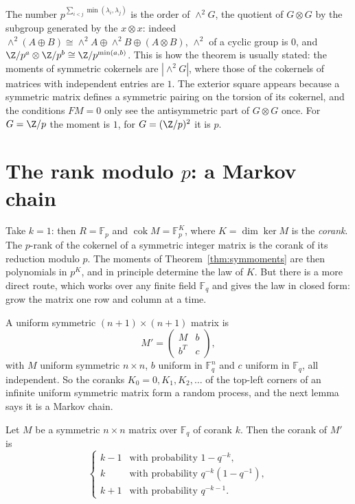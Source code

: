 \begin{remark}\label{rem:wedge}
The number $p^{\sum_{i<j}\min(\lambda_i,\lambda_j)}$ is the order of $\wedge^2G$, the quotient of $G\otimes G$ by the subgroup generated by the $x\otimes x$: indeed $\wedge^2(A\oplus B)\cong\wedge^2A\oplus\wedge^2B\oplus(A\otimes B)$, $\wedge^2$ of a cyclic group is $0$, and $\Z/p^a\otimes\Z/p^b\cong\Z/p^{\min(a,b)}$. This is how the theorem is usually stated: the moments of symmetric cokernels are $|\wedge^2G|$, where those of the cokernels of matrices with independent entries are $1$. The exterior square appears because a symmetric matrix defines a symmetric pairing on the torsion of its cokernel, and the conditions $FM=0$ only see the antisymmetric part of $G\otimes G$ once. For $G=\Z/p$ the moment is $1$, for $G=(\Z/p)^2$ it is $p$.
\end{remark}

\section{The rank modulo $p$: a Markov chain}

Take $k=1$: then $R=\mathbb F_p$ and $\operatorname{cok}M=\mathbb F_p^{K}$, where $K=\dim\ker M$ is the \emph{corank}. The $p$-rank of the cokernel of a symmetric integer matrix is the corank of its reduction modulo $p$. The moments of Theorem~\ref{thm:symmoments} are then polynomials in $p^K$, and in principle determine the law of $K$. But there is a more direct route, which works over any finite field $\mathbb F_q$ and gives the law in closed form: grow the matrix one row and column at a time.

A uniform symmetric $(n+1)\times(n+1)$ matrix is
\[
M'=\begin{pmatrix}M&b\\b^T&c\end{pmatrix},
\]
with $M$ uniform symmetric $n\times n$, $b$ uniform in $\mathbb F_q^n$ and $c$ uniform in $\mathbb F_q$, all independent. So the coranks $K_0=0,K_1,K_2,\dots$ of the top-left corners of an infinite uniform symmetric matrix form a random process, and the next lemma says it is a Markov chain.

\begin{lemma}\label{lem:corankstep}
Let $M$ be a symmetric $n\times n$ matrix over $\mathbb F_q$ of corank $k$. Then the corank of $M'$ is
\[
\begin{cases}
k-1&\text{with probability }1-q^{-k},\\
k&\text{with probability }q^{-k}(1-q^{-1}),\\
k+1&\text{with probability }q^{-k-1}.
\end{cases}
\]
\end{lemma}

